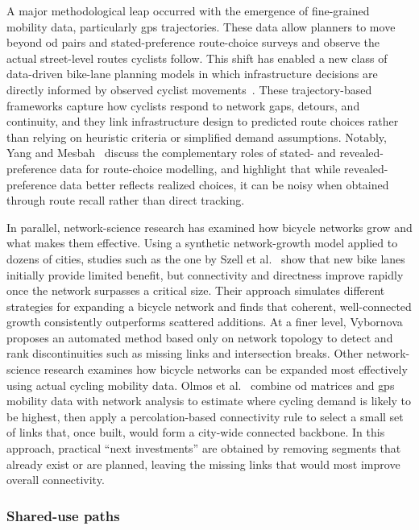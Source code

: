    A major methodological leap occurred with the emergence of fine-grained mobility data, particularly \ac{gps} trajectories. These data allow planners to move beyond \ac{od} pairs and stated-preference route-choice surveys and observe the actual street-level routes cyclists follow. This shift has enabled a new class of data-driven bike-lane planning models in which infrastructure decisions are directly informed by observed cyclist movements~\cite{Liu2022, Bao2017}. These trajectory-based frameworks capture how cyclists respond to network gaps, detours, and continuity, and they link infrastructure design to predicted route choices rather than relying on heuristic criteria or simplified demand assumptions. 
    Notably, Yang and Mesbah~\cite{Yang2013} discuss the complementary roles of stated- and revealed-preference data for route-choice modelling, and highlight that while revealed-preference data better reflects realized choices, it can be noisy when obtained through route recall rather than direct tracking.
    
    In parallel, network-science research has examined how bicycle networks grow and what makes them effective. Using a synthetic network-growth model applied to dozens of cities, studies such as the one by Szell et al.~\cite{Szell2022} show that new bike lanes initially provide limited benefit, but connectivity and directness improve rapidly once the network surpasses a critical size. Their approach simulates different strategies for expanding a bicycle network and finds that coherent, well-connected growth consistently outperforms scattered additions. At a finer level, Vybornova~\cite{Vybornova2021} proposes an automated method based only on network topology to detect and rank discontinuities such as missing links and intersection breaks. Other network-science research examines how bicycle networks can be expanded most effectively using actual cycling mobility data. Olmos et al.~\cite{Olmos2020} combine \ac{od} matrices and \ac{gps} mobility data with network analysis to estimate where cycling demand is likely to be highest, then apply a percolation-based connectivity rule to select a small set of links that, once built, would form a city-wide connected backbone. In this approach, practical ``next investments'' are obtained by removing segments that already exist or are planned, leaving the missing links that would most improve overall connectivity. 
    

    \subsubsection{Shared-use paths}

